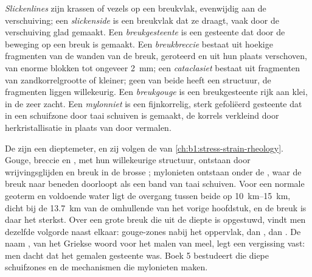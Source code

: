 \begin{definition}\label{def:b1:faults-folds-fabrics:fault-rocks}
\emph{Slickenlines} zijn krassen of vezels op een breukvlak, evenwijdig aan de verschuiving; een \emph{slickenside} is een breukvlak dat ze draagt, vaak door de verschuiving glad gemaakt. Een \emph{breukgesteente} is een gesteente dat door de beweging op een breuk is gemaakt. Een
\emph{breukbreccie} bestaat uit hoekige fragmenten van de wanden van de breuk, geroteerd en uit hun plaats verschoven, van enorme blokken tot ongeveer \qty{2}{mm}; een \emph{cataclasiet} bestaat uit fragmenten van zandkorrelgrootte of kleiner; geen van beide heeft een structuur, de fragmenten liggen willekeurig. Een \emph{breukgouge} is een breukgesteente rijk aan klei, in de  zeer zacht. Een \emph{mylonniet} is een fijnkorrelig, sterk gefoliëerd gesteente dat in een schuifzone door taai schuiven is gemaakt, de korrels verkleind door herkristallisatie in plaats van door vermalen.
\end{definition}

De  zijn een dieptemeter, en zij volgen de  van \cref{ch:b1:stress-strain-rheology}. Gouge, breccie en , met hun willekeurige structuur, ontstaan door wrijvingsglijden en breuk in de brosse ; mylonieten ontstaan onder de , waar de breuk naar beneden doorloopt als een band van taai schuiven. Voor een normale geoterm en voldoende water ligt de overgang tussen beide op \qtyrange{10}{15}{km}, dicht bij de \qty{13.7}{km} van de omhullende van het vorige hoofdstuk, en de breuk is daar het sterkst. Over een grote breuk die uit de diepte is opgestuwd, vindt men dezelfde volgorde naast elkaar: gouge-zones nabij het oppervlak, dan , dan .
De naam , van het Griekse woord voor het malen van meel, legt een vergissing vast: men dacht dat het gemalen gesteente was. Boek 5 bestudeert die diepe schuifzones en de mechanismen die mylonieten maken.

